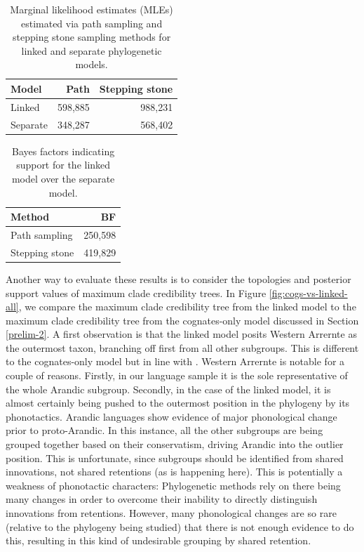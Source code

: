 \begin{table}

\caption[Marginal likelihood estimates (MLEs) for linked and separate phylogenetic models]{\label{tab:linked-vs-separate-mles}Marginal likelihood estimates (MLEs) estimated via path sampling and stepping stone sampling methods for linked and separate phylogenetic models.}
\centering
\begin{tabular}[t]{lrr}
\toprule
Model & Path & Stepping stone\\
\midrule
Linked & 598,885 & 988,231\\
Separate & 348,287 & 568,402\\
\bottomrule
\end{tabular}
\end{table}

\begin{table}

\caption[Bayes factors indicating support for the linked model over the separate model]{\label{tab:linked-vs-separate-bfs}Bayes factors indicating support for the linked model over the separate model.}
\centering
\begin{tabular}[t]{lr}
\toprule
Method & BF\\
\midrule
Path sampling & 250,598\\
Stepping stone & 419,829\\
\bottomrule
\end{tabular}
\end{table}

Another way to evaluate these results is to consider the topologies and posterior support values of maximum clade credibility trees. In Figure \ref{fig:cogs-vs-linked-all}, we compare the maximum clade credibility tree from the linked model to the maximum clade credibility tree from the cognates-only model discussed in Section \ref{prelim-2}. A first observation is that the linked model posits Western Arrernte as the outermost taxon, branching off first from all other subgroups. This is different to the cognates-only model but in line with \textcite{bouckaert_origin_2018}. Western Arrernte is notable for a couple of reasons. Firstly, in our language sample it is the sole representative of the whole Arandic subgroup. Secondly, in the case of the linked model, it is almost certainly being pushed to the outermost position in the phylogeny by its phonotactics. Arandic languages show evidence of major phonological change prior to proto-Arandic. In this instance, all the other subgroups are being grouped together based on their conservatism, driving Arandic into the outlier position. This is unfortunate, since subgroups should be identified from shared innovations, not shared retentions (as is happening here). This is potentially a weakness of phonotactic characters: Phylogenetic methods rely on there being many changes in order to overcome their inability to directly distinguish innovations from retentions. However, many phonological changes are so rare (relative to the phylogeny being studied) that there is not enough evidence to do this, resulting in this kind of undesirable grouping by shared retention.

